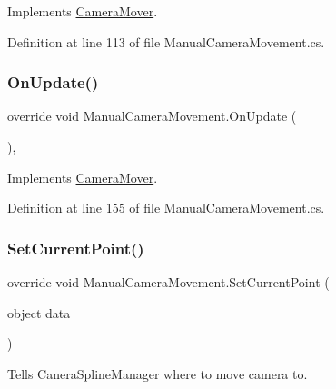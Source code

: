 Implements \mbox{\hyperlink{class_camera_mover_ab96169179c915b4c8599c956dc572fc7}{Camera\+Mover}}.



Definition at line 113 of file Manual\+Camera\+Movement.\+cs.

\mbox{\label{class_manual_camera_movement_a0ea298439b1602ebd031bcccd411e2f4}} 
\subsubsection{\texorpdfstring{On\+Update()}{OnUpdate()}}
{\footnotesize\ttfamily override void Manual\+Camera\+Movement.\+On\+Update (\begin{DoxyParamCaption}{ }\end{DoxyParamCaption})\hspace{0.3cm}{\ttfamily [protected]}, {\ttfamily [virtual]}}



Implements \mbox{\hyperlink{class_camera_mover_add4a882d9c8684a75d9d2cdacf90a74f}{Camera\+Mover}}.



Definition at line 155 of file Manual\+Camera\+Movement.\+cs.

\mbox{\label{class_manual_camera_movement_a5c0dbb93ee2c14d66e55c1ce090a8bb4}} 
\subsubsection{\texorpdfstring{Set\+Current\+Point()}{SetCurrentPoint()}}
{\footnotesize\ttfamily override void Manual\+Camera\+Movement.\+Set\+Current\+Point (\begin{DoxyParamCaption}\item[{object}]{data }\end{DoxyParamCaption})\hspace{0.3cm}{\ttfamily [virtual]}}



Tells Canera\+Spline\+Manager where to move camera to. 



